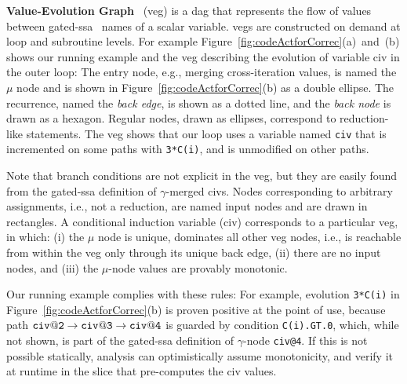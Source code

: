 \documentclass{sig-alternate}
\begin{document}
{\bf Value-Evolution Graph}~\cite{VEG} ({\sc veg}) is a {\sc dag}  %
that represents the flow of values between gated-{\sc ssa}~\cite{GatedSSA} names 
of a scalar variable.  
%
{\sc veg}s are constructed on demand at loop and subroutine levels.
For example Figure~\ref{fig:codeActforCorrec}(a)~and~(b) shows 
our running example and the {\sc veg} describing the evolution of
variable {\sc civ} in the outer loop: %
%
The entry node, e.g., merging cross-iteration values,  is named 
the $\mu$ node and is shown in Figure~\ref{fig:codeActforCorrec}(b) 
as a double ellipse. The recurrence, named the {\em back edge}, 
is shown as a dotted line, and the {\em back node} is drawn as a hexagon.
%
Regular nodes, drawn as ellipses, correspond to reduction-like 
statements. The {\sc veg} shows that our loop %
uses a variable named {\tt civ} that is incremented on some %
paths with {\tt 3*C(i)}, and is unmodified on other paths. 

Note that branch conditions are not explicit in the {\sc veg}, 
but they are easily found from the gated-{\sc ssa} definition 
of $\gamma$-merged {\sc civ}s. %
%
Nodes corresponding to arbitrary assignments, i.e., not a reduction, 
are named input nodes and are drawn in rectangles. 
%
A conditional induction variable ({\sc civ}) corresponds to a
particular {\sc veg}, in which:
  (i) the $\mu$ node is unique, dominates all other {\sc veg} nodes,
            i.e., is reachable from within the {\sc veg} only through its
            unique back edge, %
%
 (ii) there are no input nodes, and %
%
(iii) the $\mu$-node values are provably monotonic.
            
Our running example complies with these rules:
For example, evolution {\tt 3*C(i)} in 
Figure~\ref{fig:codeActforCorrec}(b) is proven positive at the 
point of use, because path 
${\tt civ@2}\rightarrow{\tt civ@3}\rightarrow{\tt civ@4}$
is guarded by condition {\tt C(i).GT.0}, which, while not 
shown, is part of the gated-{\sc ssa} definition of $\gamma$-node {\tt civ@4}. 
If this is not possible statically, analysis can optimistically
assume monotonicity, and verify it at runtime in the slice 
that pre-computes the {\sc civ} values. 

\vspace{1ex}
\end{document}
